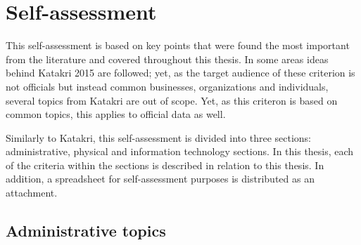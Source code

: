 \documentclass{article}
\begin{document}
\section{Self-assessment}
This self-assessment is based on key points that were found the most important from the literature and covered throughout this thesis. In some areas ideas behind Katakri 2015 are followed; yet, as the target audience of these criterion is not officials but instead common businesses, organizations and individuals, several topics from Katakri are out of scope. Yet, as this criteron is based on common topics, this applies to official data as well.
\par
Similarly to Katakri, this self-assessment is divided into three sections: administrative, physical and information technology sections. In this thesis, each of the criteria within the sections is described in relation to this thesis. In addition, a spreadsheet for self-assessment purposes is distributed as an attachment.
\subsection{Administrative topics}
\end{document}
